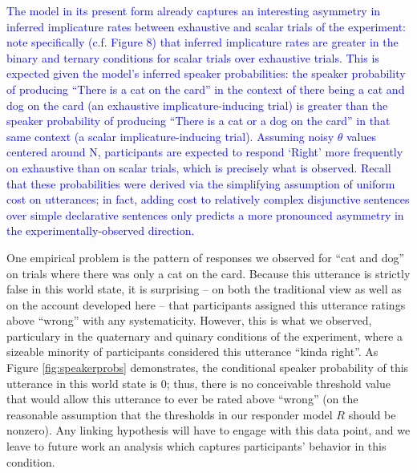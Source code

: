 \documentclass[man]{apa6}
\newcommand{\change}[1]{\textcolor{Blue}{#1}}
\theoremstyle{definition}
\theoremstyle{definition}
\theoremstyle{definition}
\theoremstyle{remark}
\begin{document}
\change{The model in its present form already captures an interesting asymmetry in inferred implicature rates between exhaustive and scalar trials of the experiment: note specifically (c.f. Figure 8) that inferred implicature rates are greater in the binary and ternary conditions for scalar trials over exhaustive trials. This is expected given the model's inferred speaker probabilities: the speaker probability of producing ``There is a cat on the card'' in the context of there being a cat and dog on the card (an exhaustive implicature-inducing trial) is greater than the speaker probability of producing ``There is a cat or a dog on the card'' in that same context (a scalar implicature-inducing trial). Assuming noisy  $\theta$ values centered around N, participants are expected to respond `Right' more frequently on exhaustive than on scalar trials, which is precisely what is observed. Recall that these probabilities were derived via the simplifying assumption of uniform cost on utterances; in fact, adding cost to relatively complex disjunctive sentences over simple declarative sentences only predicts a more pronounced asymmetry in the experimentally-observed direction.}



One  empirical problem is the pattern of responses we observed
for \enquote{cat and dog} on trials where there was only a cat on the
card. Because this utterance is strictly false in this world state, it
is surprising -- on both the traditional view as well as on the account
developed here -- that participants assigned this utterance ratings
above \enquote{wrong} with any systematicity. However, this is 
what we observed, particulary in the quaternary and quinary conditions
of the experiment, where a sizeable minority of participants considered
this utterance \enquote{kinda right}. As Figure \ref{fig:speakerprobs}
demonstrates, the conditional speaker probability of this utterance in
this world state is 0; thus, there is no conceivable threshold value
that would allow this utterance to ever be rated above \enquote{wrong}
(on the reasonable assumption that the thresholds in our responder model
\(R\) should be nonzero). Any linking hypothesis will have to engage
with this data point, and we leave to future work an analysis which
captures participants' behavior in this condition.
\end{document}
